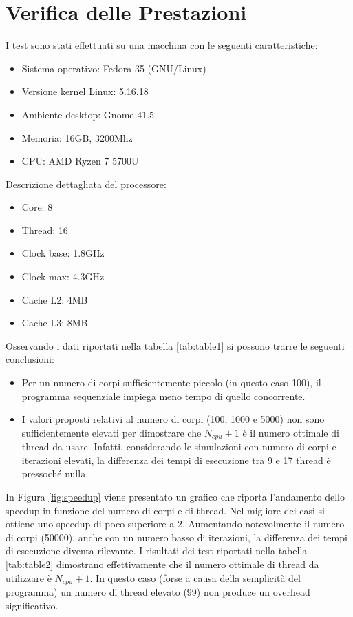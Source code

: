 \documentclass[12pt,a4paper,openright,twoside]{book}
\begin{document}
\chapter{Verifica delle Prestazioni} %
\label{chap:Verifica delle Prestazioni}

I test sono stati effettuati su una macchina con le seguenti caratteristiche:
\begin{itemize}
	\item Sistema operativo: Fedora 35 (GNU/Linux)
	\item Versione kernel Linux: 5.16.18
	\item Ambiente desktop: Gnome 41.5
	\item Memoria: 16GB, 3200Mhz
	\item CPU: AMD Ryzen 7 5700U
\end{itemize}
Descrizione dettagliata del processore:
\begin{itemize}
	\item Core: 8
	\item Thread: 16
	\item Clock base: 1.8GHz
	\item Clock max: 4.3GHz
	\item Cache L2: 4MB
	\item Cache L3: 8MB
\end{itemize}

Osservando i dati riportati nella tabella \ref{tab:table1}
si possono trarre le seguenti conclusioni:
\begin{itemize}
	\item Per un numero di corpi sufficientemente piccolo (in questo caso 100),
	il programma sequenziale impiega meno tempo di quello concorrente.
	\item I valori proposti relativi al numero di corpi (100, 1000 e 5000) non sono sufficientemente elevati per
	dimostrare che $N_{cpu}+1$ è il numero ottimale di thread da usare. Infatti, considerando
	le simulazioni con numero di corpi e iterazioni elevati, la differenza dei tempi di esecuzione tra 9 e 17 thread è pressoché nulla.
\end{itemize}

In Figura \ref{fig:speedup} viene presentato un grafico che riporta l'andamento dello speedup in funzione del numero di corpi e di thread.
Nel migliore dei casi si ottiene uno speedup di poco superiore a 2.
Aumentando notevolmente il numero di corpi (50000), anche con un numero basso di iterazioni,
la differenza dei tempi di esecuzione diventa rilevante.
I risultati dei test riportati nella tabella \ref{tab:table2} dimostrano effettivamente che
il numero ottimale di thread da utilizzare è $N_{cpu} + 1$. In questo caso (forse a causa della semplicità del programma)
un numero di thread elevato (99) non produce un overhead significativo.
\end{document}
